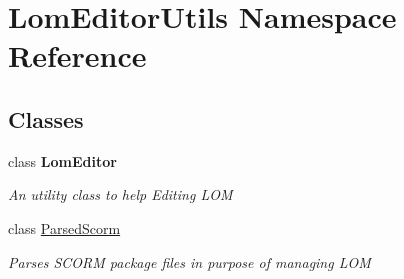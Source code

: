 \hypertarget{namespace_lom_editor_utils}{}\section{Lom\+Editor\+Utils Namespace Reference}
\label{namespace_lom_editor_utils}
\subsection*{Classes}
\begin{DoxyCompactItemize}
\item 
class {\bfseries Lom\+Editor}
\begin{DoxyCompactList}\small\item\em An utility class to help Editing L\+OM \end{DoxyCompactList}\item 
class \hyperlink{class_lom_editor_utils_1_1_parsed_scorm}{Parsed\+Scorm}
\begin{DoxyCompactList}\small\item\em Parses S\+C\+O\+RM package files in purpose of managing L\+OM \end{DoxyCompactList}\end{DoxyCompactItemize}
